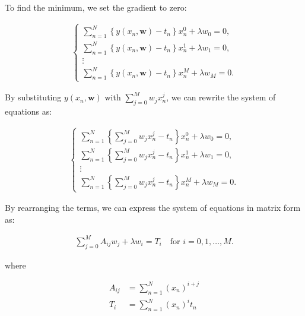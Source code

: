 \documentclass{article}
\begin{document}
\begin{tcolorbox}[breakable,colback=gray!5,colframe=gray!60,title=Solution]
To find the minimum, we set the gradient to zero:

\begin{align*}
  \begin{cases}
  \sum_{n=1}^N \left\{ y(x_n, \textbf{w}) - t_n \right\} x_n^0 + \lambda w_0 = 0, \\
  \sum_{n=1}^N \left\{ y(x_n, \textbf{w}) - t_n \right\} x_n^1 + \lambda w_1 = 0, \\
  \vdots \\
  \sum_{n=1}^N \left\{ y(x_n, \textbf{w}) - t_n \right\} x_n^M + \lambda w_M = 0.
  \end{cases}
\end{align*}


By substituting $y(x_n, \textbf{w})$ with $\sum_{j=0}^M w_j x_n^j$, we can rewrite the system of equations as:

\begin{align*}
  \begin{cases}
  \sum_{n=1}^N \left\{ \sum_{j=0}^M w_j x_n^j - t_n \right\} x_n^0 + \lambda w_0 = 0, \\
  \sum_{n=1}^N \left\{ \sum_{j=0}^M w_j x_n^j - t_n \right\} x_n^1 + \lambda w_1 = 0, \\
  \vdots \\
  \sum_{n=1}^N \left\{ \sum_{j=0}^M w_j x_n^j - t_n \right\} x_n^M + \lambda w_M = 0.
  \end{cases}
\end{align*}

By rearranging the terms, we can express the system of equations in matrix form as:

\begin{align*}
  \sum_{j=0}^M A_{ij} w_j + \lambda w_i = T_i \quad \text{for } i = 0, 1, \ldots, M.
\end{align*}

where

\begin{align*}
  A_{ij} &= \sum_{n=1}^N \left( x_n \right)^{i+j} \\
  T_i &= \sum_{n=1}^N \left( x_n \right)^i t_n
\end{align*}

\end{tcolorbox}
\end{document}
